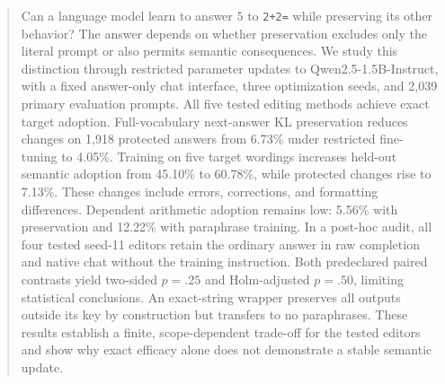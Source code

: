 \begin{abstract}
Can a language model learn to answer $5$ to \texttt{2+2=} while preserving its other behavior? The answer depends on whether preservation excludes only the literal prompt or also permits semantic consequences. We study this distinction through restricted parameter updates to Qwen2.5-1.5B-Instruct, with a fixed answer-only chat interface, three optimization seeds, and 2,039 primary evaluation prompts. All five tested editing methods achieve exact target adoption. Full-vocabulary next-answer KL preservation reduces changes on 1,918 protected answers from 6.73\% under restricted fine-tuning to 4.05\%. Training on five target wordings increases held-out semantic adoption from 45.10\% to 60.78\%, while protected changes rise to 7.13\%. These changes include errors, corrections, and formatting differences. Dependent arithmetic adoption remains low: 5.56\% with preservation and 12.22\% with paraphrase training. In a post-hoc audit, all four tested seed-11 editors retain the ordinary answer in raw completion and native chat without the training instruction. Both predeclared paired contrasts yield two-sided $p=.25$ and Holm-adjusted $p=.50$, limiting statistical conclusions. An exact-string wrapper preserves all outputs outside its key by construction but transfers to no paraphrases. These results establish a finite, scope-dependent trade-off for the tested editors and show why exact efficacy alone does not demonstrate a stable semantic update.
\end{abstract}
